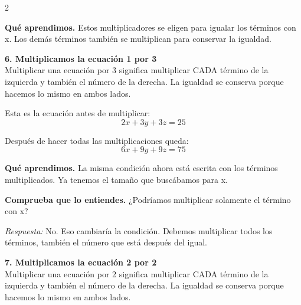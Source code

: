 \documentclass[11pt,a4paper,landscape]{article}
\begin{document}
\begin{multicols*}{2}
\begin{minipage}{\linewidth}
\par\smallskip\textbf{Qué aprendimos.} Estos multiplicadores se eligen para igualar los términos con x. Los demás términos también se multiplican para conservar la igualdad.
\end{minipage}\par\medskip
\noindent\begin{minipage}{\linewidth}\textbf{6. Multiplicamos la ecuación 1 por 3}\\[2pt]Multiplicar una ecuación por 3 significa multiplicar CADA término de la izquierda y también el número de la derecha. La igualdad se conserva porque hacemos lo mismo en ambos lados.
\par\smallskip Esta es la ecuación antes de multiplicar:
\[2x + 3y + 3z = 25\]
\par{}\par\smallskip
\par\smallskip Después de hacer todas las multiplicaciones queda:
\[6x + 9y + 9z = 75\]
\par\smallskip\textbf{Qué aprendimos.} La misma condición ahora está escrita con los términos multiplicados. Ya tenemos el tamaño que buscábamos para x.
\par\smallskip\textbf{Comprueba que lo entiendes.} ¿Podríamos multiplicar solamente el término con x?\par\textit{Respuesta:} No. Eso cambiaría la condición. Debemos multiplicar todos los términos, también el número que está después del igual.
\end{minipage}\par\medskip
\noindent\begin{minipage}{\linewidth}\textbf{7. Multiplicamos la ecuación 2 por 2}\\[2pt]Multiplicar una ecuación por 2 significa multiplicar CADA término de la izquierda y también el número de la derecha. La igualdad se conserva porque hacemos lo mismo en ambos lados.

\end{minipage}
\end{multicols*}
\end{document}

